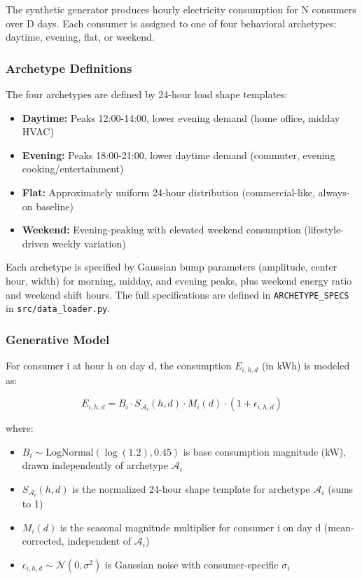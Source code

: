 \documentclass[11pt,a4paper]{article}
\begin{document}
The synthetic generator produces hourly electricity consumption for N consumers over D days. Each consumer is assigned to one of four behavioral archetypes: daytime, evening, flat, or weekend.

\subsubsection{Archetype Definitions}

The four archetypes are defined by 24-hour load shape templates:

\begin{itemize}
    \item \textbf{Daytime:} Peaks 12:00-14:00, lower evening demand (home office, midday HVAC)
    \item \textbf{Evening:} Peaks 18:00-21:00, lower daytime demand (commuter, evening cooking/entertainment)
    \item \textbf{Flat:} Approximately uniform 24-hour distribution (commercial-like, always-on baseline)
    \item \textbf{Weekend:} Evening-peaking with elevated weekend consumption (lifestyle-driven weekly variation)
\end{itemize}

Each archetype is specified by Gaussian bump parameters (amplitude, center hour, width) for morning, midday, and evening peaks, plus weekend energy ratio and weekend shift hours. The full specifications are defined in \texttt{ARCHETYPE\_SPECS} in \texttt{src/data\_loader.py}.

\subsubsection{Generative Model}

For consumer i at hour h on day d, the consumption $E_{i,h,d}$ (in kWh) is modeled as:

\begin{equation}
E_{i,h,d} = B_i \cdot S_{\mathcal{A}_i}(h, d) \cdot M_i(d) \cdot (1 + \epsilon_{i,h,d})
\end{equation}

where:
\begin{itemize}
    \item $B_i \sim \text{LogNormal}(\log(1.2), 0.45)$ is base consumption magnitude (kW), drawn independently of archetype $\mathcal{A}_i$
    \item $S_{\mathcal{A}_i}(h, d)$ is the normalized 24-hour shape template for archetype $\mathcal{A}_i$ (sums to 1)
    \item $M_i(d)$ is the seasonal magnitude multiplier for consumer i on day d (mean-corrected, independent of $\mathcal{A}_i$)
    \item $\epsilon_{i,h,d} \sim \mathcal{N}(0, \sigma^2)$ is Gaussian noise with consumer-specific $\sigma_i$
\end{itemize}
\end{document}
